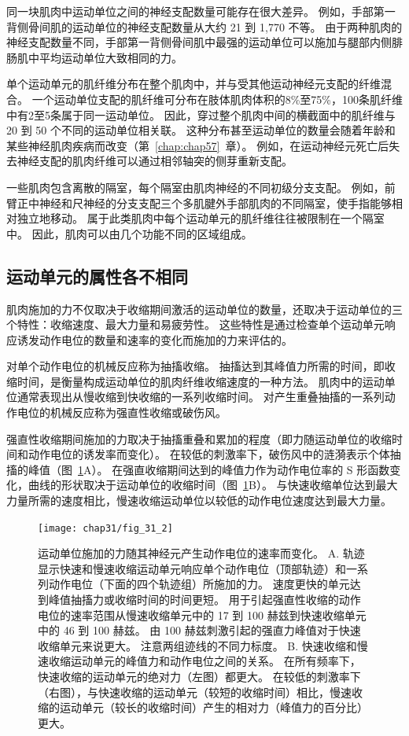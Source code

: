 同一块肌肉中运动单位之间的神经支配数量可能存在很大差异。
例如，手部第一背侧骨间肌的运动单位的神经支配数量从大约 21 到 1,770 不等。
由于两种肌肉的神经支配数量不同，手部第一背侧骨间肌中最强的运动单位可以施加与腿部内侧腓肠肌中平均运动单位大致相同的力。


单个运动单元的肌纤维分布在整个肌肉中，并与受其他运动神经元支配的纤维混合。
一个运动单位支配的肌纤维可分布在肢体肌肉体积的8\%至75\%，100条肌纤维中有2至5条属于同一运动单位。
因此，穿过整个肌肉中间的横截面中的肌纤维与 20 到 50 个不同的运动单位相关联。
这种分布甚至运动单位的数量会随着年龄和某些神经肌肉疾病而改变（第~\ref{chap:chap57}~章）。
例如，在运动神经元死亡后失去神经支配的肌肉纤维可以通过相邻轴突的侧芽重新支配。


一些肌肉包含离散的隔室，每个隔室由肌肉神经的不同初级分支支配。
例如，前臂正中神经和尺神经的分支支配三个多肌腱外手部肌肉的不同隔室，使手指能够相对独立地移动。
属于此类肌肉中每个运动单元的肌纤维往往被限制在一个隔室中。
因此，肌肉可以由几个功能不同的区域组成。



\subsection{运动单元的属性各不相同}

肌肉施加的力不仅取决于收缩期间激活的运动单位的数量，还取决于运动单位的三个特性：收缩速度、最大力量和易疲劳性。
这些特性是通过检查单个运动单元响应诱发动作电位的数量和速率的变化而施加的力来评估的。


对单个动作电位的机械反应称为抽搐收缩。
抽搐达到其峰值力所需的时间，即收缩时间，是衡量构成运动单位的肌肉纤维收缩速度的一种方法。
肌肉中的运动单位通常表现出从慢收缩到快收缩的一系列收缩时间。
对产生重叠抽搐的一系列动作电位的机械反应称为强直性收缩或破伤风。


强直性收缩期间施加的力取决于抽搐重叠和累加的程度（即力随运动单位的收缩时间和动作电位的诱发率而变化）。
在较低的刺激率下，破伤风中的涟漪表示个体抽搐的峰值（图~\ref{fig:31_2}A）。 
在强直收缩期间达到的峰值力作为动作电位率的 S 形函数变化，曲线的形状取决于运动单位的收缩时间（图~\ref{fig:31_2}B）。
与快速收缩单位达到最大力量所需的速度相比，慢速收缩运动单位以较低的动作电位速度达到最大力量。


\begin{figure}[htbp]
	\centering
	\texttt{[image: chap31/fig\_31\_2]}
	\caption{运动单位施加的力随其神经元产生动作电位的速率而变化。
		A. 轨迹显示快速和慢速收缩运动单元响应单个动作电位（顶部轨迹）和一系列动作电位（下面的四个轨迹组）所施加的力。
	速度更快的单元达到峰值抽搐力或收缩时间的时间更短。
	用于引起强直性收缩的动作电位的速率范围从慢速收缩单元中的 17 到 100 赫兹到快速收缩单元中的 46 到 100 赫兹。
	由 100 赫兹刺激引起的强直力峰值对于快速收缩单元来说更大。
	注意两组迹线的不同力标度\cite{botterman1986gradation,fuglevand1999force,macefield1996contractile}。
	B. 快速收缩和慢速收缩运动单元的峰值力和动作电位之间的关系。
	在所有频率下，快速收缩的运动单元的绝对力（左图）都更大。
	在较低的刺激率下（右图），与快速收缩的运动单元（较短的收缩时间）相比，慢速收缩的运动单元（较长的收缩时间）产生的相对力（峰值力的百分比）更大。}
	\label{fig:31_2}
\end{figure}


